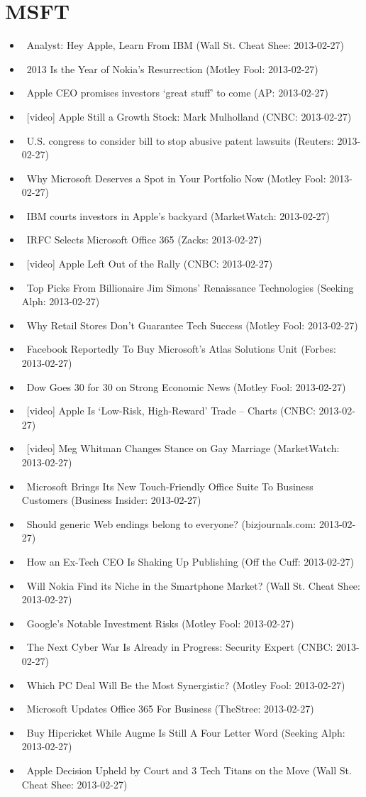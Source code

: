 \documentclass[11pt,asymmetric]{article}
\begin{document}
\section*{MSFT}
\begin{itemize}
\item\ Analyst: Hey Apple, Learn From IBM (Wall St. Cheat Shee: 2013-02-27)
\item\ 2013 Is the Year of Nokia's Resurrection (Motley Fool: 2013-02-27)
\item\ Apple CEO promises investors `great stuff' to come (AP: 2013-02-27)
\item\ [video] Apple Still a Growth Stock: Mark Mulholland (CNBC: 2013-02-27)
\item\ U.S. congress to consider bill to stop abusive patent lawsuits (Reuters: 2013-02-27)
\item\ Why Microsoft Deserves a Spot in Your Portfolio Now (Motley Fool: 2013-02-27)
\item\ IBM courts investors in Apple’s backyard (MarketWatch: 2013-02-27)
\item\ IRFC Selects Microsoft Office 365 (Zacks: 2013-02-27)
\item\ [video] Apple Left Out of the Rally (CNBC: 2013-02-27)
\item\ Top Picks From Billionaire Jim Simons' Renaissance Technologies (Seeking Alph: 2013-02-27)
\item\ Why Retail Stores Don't Guarantee Tech Success (Motley Fool: 2013-02-27)
\item\ Facebook Reportedly To Buy Microsoft's Atlas Solutions Unit (Forbes: 2013-02-27)
\item\ Dow Goes 30 for 30 on Strong Economic News (Motley Fool: 2013-02-27)
\item\ [video] Apple Is `Low-Risk, High-Reward' Trade -- Charts (CNBC: 2013-02-27)
\item\ [video] Meg Whitman Changes Stance on Gay Marriage (MarketWatch: 2013-02-27)
\item\ Microsoft Brings Its New Touch-Friendly Office Suite To Business Customers (Business Insider: 2013-02-27)
\item\ Should generic Web endings belong to everyone? (bizjournals.com: 2013-02-27)
\item\ How an Ex-Tech CEO Is Shaking Up Publishing (Off the Cuff: 2013-02-27)
\item\ Will Nokia Find its Niche in the Smartphone Market? (Wall St. Cheat Shee: 2013-02-27)
\item\ Google's Notable Investment Risks (Motley Fool: 2013-02-27)
\item\ The Next Cyber War Is Already in Progress: Security Expert (CNBC: 2013-02-27)
\item\ Which PC Deal Will Be the Most Synergistic? (Motley Fool: 2013-02-27)
\item\ Microsoft Updates Office 365 For Business (TheStree: 2013-02-27)
\item\ Buy Hipcricket While Augme Is Still A Four Letter Word (Seeking Alph: 2013-02-27)
\item\ Apple Decision Upheld by Court and 3 Tech Titans on the Move (Wall St. Cheat Shee: 2013-02-27)
\end{itemize}
\end{document}
